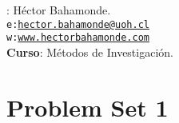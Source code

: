 \documentclass[10pt]{article}
\begin{document}


\thispagestyle{fancy} %





\hspace{-5mm}{\bf Profesor}: H\'ector Bahamonde.\\
\texttt{e:}\href{mailto:hector.bahamonde@uoh.cl}{\texttt{hector.bahamonde@uoh.cl}}\\
\texttt{w:}\href{http://www.hectorbahamonde.com}{\texttt{www.hectorbahamonde.com}}\\
{\bf Curso}: M\'etodos de Investigaci\'on.

\section*{Problem Set 1}
\end{document}

